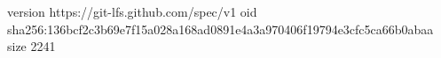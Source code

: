 version https://git-lfs.github.com/spec/v1
oid sha256:136bcf2c3b69e7f15a028a168ad0891e4a3a970406f19794e3cfc5ca66b0abaa
size 2241
